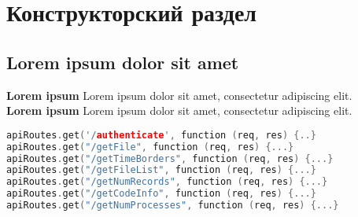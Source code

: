 \chapter{Конструкторский раздел}
\label{cha:design}


\section{Lorem ipsum dolor sit amet}

\textbf{Lorem ipsum} Lorem ipsum dolor sit amet, consectetur adipiscing elit. \\
\textbf{Lorem ipsum} Lorem ipsum dolor sit amet, consectetur adipiscing elit. \\

\begin{lstlisting}[language=c++]
apiRoutes.get('/authenticate', function (req, res) {..}
apiRoutes.get("/getFile", function (req, res) {...}
apiRoutes.get("/getTimeBorders", function (req, res) {...}
apiRoutes.get("/getFileList", function (req, res) {...}
apiRoutes.get("/getNumRecords", function (req, res) {...}
apiRoutes.get("/getCodeInfo", function (req, res) {...}
apiRoutes.get("/getNumProcesses", function (req, res) {...}
\end{lstlisting}



